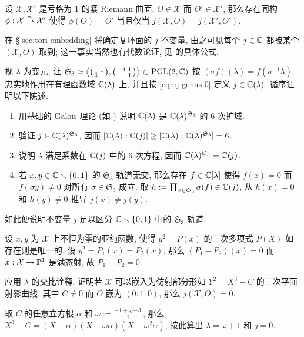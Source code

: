 \begin{theorem}\label{prop:j-classification}
	设 $\mathcal{X}, \mathcal{X}'$ 是亏格为 $1$ 的紧 Riemann 曲面, $O \in \mathcal{X}$ 而 $O' \in \mathcal{X}'$, 那么存在同构 $\phi: \mathcal{X} \stackrel{\sim}{\rightarrow} \mathcal{X}'$ 使得 $\phi(O) = O'$ 当且仅当 $j(\mathcal{X}, O) = j(\mathcal{X}', O')$.
\end{theorem}

在 \S\ref{sec:tori-embedding} 将确定复环面的 $j$-不变量, 由之可见每个 $j \in \mathbb{C}$ 都被某个 $(\mathcal{X}, O)$ 取到; 这一事实当然也有代数论证, 见 \cite[VI.1.6]{DR73} 的具体公式.

\begin{exercise}
	视 $\lambda$ 为变元, 让 $\mathfrak{S}_3 \simeq \left\langle  \bigl(\begin{smallmatrix}  & 1 \\ 1 &  \end{smallmatrix}\bigr), \bigl(\begin{smallmatrix} -1 & 1 \\  & 1 \end{smallmatrix}\bigr)  \right\rangle \subset \operatorname{PGL}(2,\mathbb{C})$ 按 $(\sigma f)(\lambda) = f(\sigma^{-1}\lambda)$ 忠实地作用在有理函数域 $\mathbb{C}(\lambda)$ 上, 并且按 \eqref{eqn:j-genus-0} 定义 $j \in \mathbb{C}(\lambda)$. 循序证明以下陈述.
	\begin{enumerate}
		\item 用基础的 Galois 理论 (如 \cite[引理 9.1.6]{Li1}) 说明 $\mathbb{C}(\lambda)$ 是 $\mathbb{C}(\lambda)^{\mathfrak{S}_3}$ 的 $6$ 次扩域.
		\item 验证 $j \in \mathbb{C}(\lambda)^{\mathfrak{S}_3}$, 因而 $[\mathbb{C}(\lambda): \mathbb{C}(j)] \geq [\mathbb{C}(\lambda): \mathbb{C}(\lambda)^{\mathfrak{S}_3}] = 6$.
		\item 说明 $\lambda$ 满足系数在 $\mathbb{C}(j)$ 中的 $6$ 次方程, 因而 $\mathbb{C}(\lambda)^{\mathfrak{S}_3} = \mathbb{C}(j)$.
		\item 若 $x,y \in \mathbb{C} \smallsetminus \{0,1\}$ 的 $\mathfrak{S}_3$-轨道无交, 那么存在 $f \in \mathbb{C}[\lambda]$ 使得 $f(x)=0$ 而 $f(\sigma y) \neq 0$ 对所有 $\sigma \in \mathfrak{S}_3$ 成立. 取 $h := \prod_{\sigma \in \mathfrak{S}_3} \sigma(f) \in \mathbb{C}(j)$, 从 $h(x)=0$ 和 $h(y) \neq 0$ 推导 $j(x) \neq j(y)$.
	\end{enumerate}
	如此便说明不变量 $j$ 足以区分 $\mathbb{C} \smallsetminus \{0,1\}$ 中的 $\mathfrak{S}_3$-轨道.
\end{exercise}

\begin{remark}\label{rem:cubic-uniqueness}
	设 $x,y$ 为 $\mathcal{X}$ 上不恒为零的亚纯函数, 使得 $y^2 = P(x)$ 的三次多项式 $P(X)$ 如存在则是唯一的. 设 $y^2 = P_1(x) = P_2(x)$, 那么 $(P_1 - P_2)(x) = 0$ 而 $x: \mathcal{X} \to \mathbb{P}^1$ 是满态射, 故 $P_1 - P_2 = 0$.
\end{remark}

\begin{exercise}\label{exo:j-equals-0}
	应用 $\lambda$ 的交比诠释, 证明若 $\mathcal{X}$ 可以嵌入为仿射部分形如 $Y^2 = X^3 - C$ 的三次平面射影曲线, 其中 $C \neq 0$ 而 $O$ 嵌为 $(0:1:0)$, 那么 $j(\mathcal{X}, O)=0$.
	
	\begin{hint}
		取 $C$ 的任意立方根 $\alpha$ 和 $\omega := \frac{-1 + \sqrt{-3}}{2}$, 那么 $X^3 - C = (X - \alpha)(X - \omega\alpha)(X - \omega^2 \alpha)$; 按此算出 $\lambda = \omega + 1$ 和 $j = 0$.
	\end{hint}
\end{exercise}

